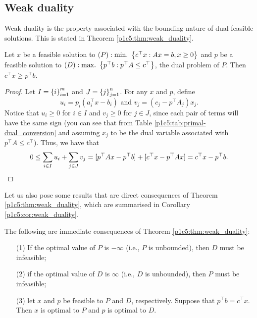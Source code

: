 \subsection{Weak duality}

Weak duality is the property associated with the bounding nature of dual feasible solutions. This is stated in Theorem \ref{p1c5:thm:weak_duality}.

\begin{theorem} \label{p1c5:thm:weak_duality}
		Let $x$ be a feasible solution to $(P) : \mathop{\text{min.~}}\left\{ c^\top x : Ax = b, x \geq 0 \right \}$ and $p$ be a feasible solution to $(D) : \mathop{\text{max.~}}\left\{ p^\top b : p^\top A \leq c^\top \right \}$, the dual problem of $P$. Then $c^\top x \geq p^\top b$.
\end{theorem}

\begin{proof}
	Let $I = \left\{ i \right \}_{i=1}^m$ and $J = \left\{ j \right \}_{j=1}^n$. For any $x$ and $p$, define
%
	  	\begin{equation*}
			u_i = p_i (a_i^\top x - b_i) \text{ and }
			v_j = (c_j - p^\top A_j)x_j.	
		\end{equation*}
%
	Notice that $u_i \geq 0$ for $i \in I$ and $v_j \geq 0$ for $j \in J$, since each pair of terms will have the same sign (you can see that from Table \ref{p1c5:tab:primal-dual_conversion} and assuming $x_j$ to be the dual variable associated with $p^\top A \leq c^\top$).  Thus, we have that
%
	\begin{equation*}
		0 \leq \sum_{i \in I} u_i + \sum_{j \in J} v_j = [p^\top Ax - p^\top b] + [c^\top x - p^\top Ax] = c^\top x - p^\top b. \qedhere
	\end{equation*}
%
\end{proof}

Let us also pose some results that are direct consequences of Theorem \ref{p1c5:thm:weak_duality}, which are summarised in Corollary \ref{p1c5:cor:weak_duality}.

\begin{corollary}\label{p1c5:cor:weak_duality}
	The following are immediate consequences of Theorem \ref{p1c5:thm:weak_duality}:
	\begin{enumerate}
		\item[(1)] If the optimal value of $P$ is $-\infty$ (i.e., $P$ is unbounded), then $D$ must be infeasible;
		\item[(2)] if the optimal value of $D$ is $\infty$ (i.e., $D$ is unbounded), then $P$ must be infeasible;
		\item[(3)] let $x$ and $p$ be feasible to $P$ and $D$, respectively. Suppose that $p^\top b = c^\top x$. Then $x$ is optimal to $P$ and $p$ is optimal to $D$.
	\end{enumerate}
\end{corollary}

